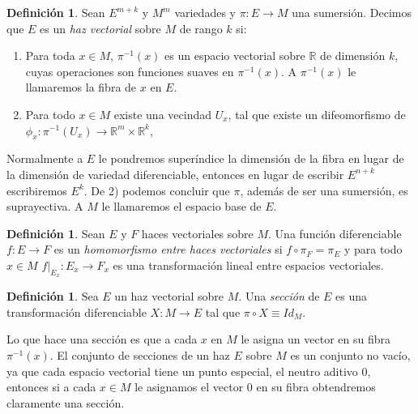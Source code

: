\documentclass{report}
\theoremstyle{definition}
\newtheorem{defi}[theorem]{Definici\'on}
\begin{document}
\begin{defi}
 Sean $E^{m+k}$ y $M^m$ variedades y $\pi: E \to M$ una sumersi\'on. Decimos que $E$ es un \textit{haz vectorial} sobre $M$ de rango $k$ si:

\begin{enumerate}
\item Para toda $x \in M$, $\pi^{-1} (x)$ es un espacio vectorial sobre $\mathbb{R}$ de dimensi\'on $k$, cuyas operaciones son funciones suaves en $\pi^{-1} (x)$. A $\pi^{-1} (x)$ le llamaremos la fibra de $x$ en $E$.
\item Para todo $x \in M$ existe una vecindad $U_x$, tal que existe un difeomorfismo de $\phi_x: \pi^{-1} (U_x) \to \mathbb{R}^m \times \mathbb{R}^k$, 


\end{enumerate}
\end{defi}
Normalmente a $E$ le pondremos super\'indice la dimensi\'on de la fibra en lugar de la dimensi\'on de variedad diferenciable, entonces en lugar de escribir $E^{n+k}$ escribiremos $E^k$. De 2) podemos concluir que $\pi$, adem\'as de ser una sumersi\'on, es suprayectiva. A $M$ le llamaremos el espacio base de $E$.

\begin{defi}
 Sean $E$ y $F$ haces vectoriales sobre $M$. Una funci\'on diferenciable $f: E \to F$ es un \textit{homomorfismo entre haces vectoriales} si $f \circ \pi_F = \pi_E$ y  para todo $x \in M$ $f \vert_{E_x}: E_x \to F_x$ es una transformaci\'on lineal entre espacios vectoriales.
 \end{defi}

\begin{defi}
 Sea $E$ un haz vectorial sobre $M$. Una \textit{secci\'on} de $E$ es una transformaci\'on diferenciable $X: M \to E$ tal que $ \pi \circ X \equiv Id_M.$
\end{defi}

 Lo que hace una secci\'on es que a cada $x$ en $M$ le asigna un vector en su fibra $\pi^{-1} (x)$. El conjunto de secciones de un haz $E$ sobre $M$ es un conjunto no vac\'io, ya que cada espacio vectorial tiene un punto especial, el neutro aditivo $0$, entonces si a cada $x \in M$ le asignamos el vector $0$ en su fibra obtendremos claramente una secci\'on.
\end{document}

